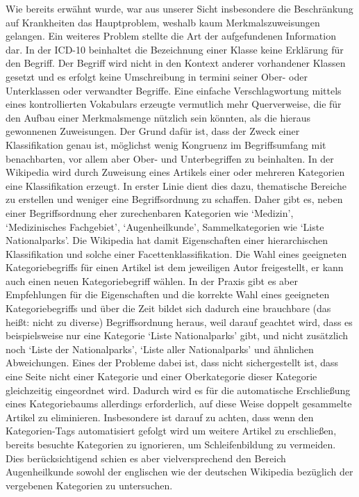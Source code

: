 \documentclass[pagesize,DIV=calc,12pt,draft]{scrreprt}
\begin{document}
Wie bereits erwähnt wurde, war aus unserer Sicht insbesondere die Beschränkung auf Krankheiten das Hauptproblem, weshalb kaum Merkmalszuweisungen gelangen. 
Ein weiteres Problem stellte die Art der aufgefundenen Information dar. 
In der ICD-10 beinhaltet die Bezeichnung einer Klasse keine Erklärung für den Begriff. 
Der Begriff wird nicht in den Kontext anderer vorhandener Klassen gesetzt und es erfolgt keine Umschreibung in termini seiner Ober- oder Unterklassen oder verwandter Begriffe. 
Eine einfache Verschlagwortung mittels eines kontrollierten Vokabulars erzeugte vermutlich mehr Querverweise, die für den Aufbau einer Merkmalsmenge nützlich sein könnten, als die hieraus gewonnenen Zuweisungen. 
Der Grund dafür ist, dass der Zweck einer Klassifikation genau ist, möglichst wenig Kongruenz im Begriffsumfang mit benachbarten, vor allem aber Ober- und Unterbegriffen zu beinhalten. 
In der Wikipedia wird durch Zuweisung eines Artikels einer oder mehreren Kategorien eine Klassifikation erzeugt. 
In erster Linie dient dies dazu, thematische Bereiche zu erstellen und weniger eine Begriffsordnung zu schaffen. 
Daher gibt es, neben einer Begriffsordnung eher zurechenbaren Kategorien wie `Medizin', `Medizinisches Fachgebiet', `Augenheilkunde', Sammelkategorien wie `Liste Nationalparks'. 
Die Wikipedia hat damit Eigenschaften einer hierarchischen Klassifikation und solche einer Facettenklassifikation. 
Die Wahl eines geeigneten Kategoriebegriffs für einen Artikel ist dem jeweiligen Autor freigestellt, er kann auch einen neuen Kategoriebegriff wählen. 
In der Praxis gibt es aber Empfehlungen für die Eigenschaften und die korrekte Wahl eines geeigneten Kategoriebegriffs und über die Zeit bildet sich dadurch eine brauchbare (das heißt: nicht zu diverse) Begriffsordnung heraus, weil darauf geachtet wird, dass es beispielsweise nur eine Kategorie `Liste Nationalparks' gibt, und nicht zusätzlich noch `Liste der Nationalparks', `Liste aller Nationalparks' und ähnlichen Abweichungen. 
Eines der Probleme dabei ist, dass nicht sichergestellt ist, dass eine Seite nicht einer Kategorie und einer Oberkategorie dieser Kategorie gleichzeitig eingeordnet wird. 
Dadurch wird es für die automatische Erschließung eines Kategoriebaums allerdings erforderlich, auf diese Weise doppelt gesammelte Artikel zu eliminieren. 
Insbesondere ist darauf zu achten, dass wenn den Kategorien-Tags automatisiert gefolgt wird um weitere Artikel zu erschließen, bereits besuchte Kategorien zu ignorieren, um Schleifenbildung zu vermeiden. 
Dies berücksichtigend schien es aber vielversprechend den Bereich Augenheilkunde sowohl der englischen wie der deutschen Wikipedia bezüglich der vergebenen Kategorien zu untersuchen. 
\end{document}
